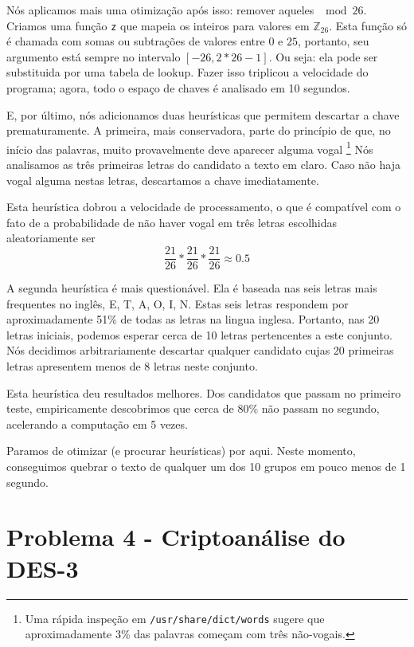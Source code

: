 \documentclass{article}
\begin{document}
Nós aplicamos mais uma otimização após isso:
remover aqueles $\mod 26$.
Criamos uma função \texttt z que mapeia os inteiros
para valores em $\mathbb{Z}_{26}$.
Esta função só é chamada com somas ou subtrações
de valores entre $0$ e $25$,
portanto, seu argumento está sempre no intervalo $[-26, 2*26-1]$.
Ou seja: ela pode ser substituida por uma tabela de lookup.
Fazer isso triplicou a velocidade do programa;
agora, todo o espaço de chaves é analisado em 10 segundos.

E, por último, nós adicionamos duas heurísticas
que permitem descartar a chave prematuramente.
A primeira, mais conservadora,
parte do princípio de que,
no início das palavras,
muito provavelmente deve aparecer alguma vogal%
\footnote{
    Uma rápida inspeção em \texttt{/usr/share/dict/words}
    sugere que aproximadamente 3\% das palavras
    começam com três não-vogais.
}
Nós analisamos as três primeiras letras do candidato a texto em claro.
Caso não haja vogal alguma nestas letras,
descartamos a chave imediatamente.

Esta heurística dobrou a velocidade de processamento,
o que é compatível com o fato de a probabilidade de não haver vogal
em três letras escolhidas aleatoriamente ser
\begin{equation}
    \frac{21}{26} * \frac{21}{26} * \frac{21}{26} \approx 0.5
\end{equation}

A segunda heurística é mais questionável.
Ela é baseada nas seis letras mais frequentes no inglês,
E, T, A, O, I, N.
Estas seis letras respondem por aproximadamente 51\%
de todas as letras na lingua inglesa.
Portanto, nas 20 letras iniciais,
podemos esperar cerca de 10 letras pertencentes a este conjunto.
Nós decidimos arbitrariamente descartar
qualquer candidato cujas 20 primeiras letras apresentem
menos de 8 letras neste conjunto.

Esta heurística deu resultados melhores.
Dos candidatos que passam no primeiro teste,
empiricamente descobrimos que cerca de 80\% não passam no segundo,
acelerando a computação em 5 vezes.

Paramos de otimizar (e procurar heurísticas) por aqui.
Neste momento, conseguimos quebrar o texto
de qualquer um dos 10 grupos em pouco menos de 1 segundo.

\section{Problema 4 - Criptoanálise do DES-3}
\end{document}
